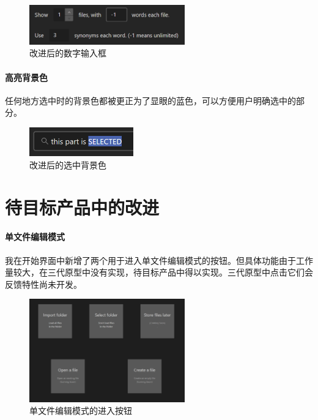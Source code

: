 \documentclass[scheme = chinese]{ctexart}
\begin{document}
\begin{figure}[h]
    \centering
    \includegraphics[width=0.6\textwidth]{images/改进-数字输入.png}
    \caption{改进后的数字输入框}
\end{figure}

\paragraph{高亮背景色}
任何地方选中时的背景色都被更正为了显眼的蓝色，可以方便用户明确选中的部分。

\begin{figure}[h]
    \centering
    \includegraphics[width=0.4\textwidth]{images/改进-选中背景色.png}
    \caption{改进后的选中背景色}
\end{figure}

\section{待目标产品中的改进}
\paragraph{单文件编辑模式}
我在开始界面中新增了两个用于进入单文件编辑模式的按钮。但具体功能由于工作量较大，在三代原型中没有实现，待目标产品中得以实现。三代原型中点击它们会反馈特性尚未开发。

\begin{figure}[h]
    \centering
    \includegraphics[width=0.6\textwidth]{images/改进-单文件编辑模式.png}
    \caption{单文件编辑模式的进入按钮}
\end{figure}
\end{document}

